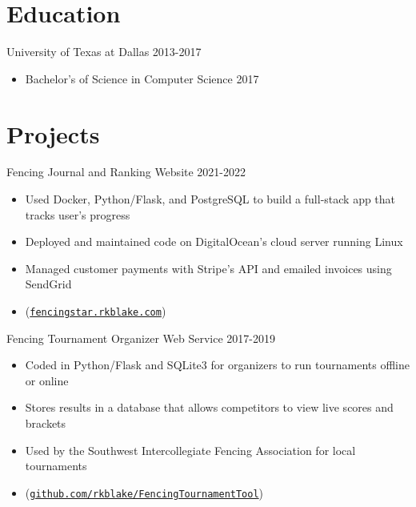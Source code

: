 \documentclass[line,margin]{res}
\begin{document}
\begin{resume}
\begin{itemize}
\end{itemize}

\vspace{-4pt}
\section{Education}
\vspace{12pt}
University of Texas at Dallas \hfill 2013-2017 \\
\vspace{-12pt}
\begin{itemize} \itemsep -2pt
	\item Bachelor's of Science in Computer Science 2017
\end{itemize}

\vspace{-4pt}
\section{Projects}
\vspace{12pt}

Fencing Journal and Ranking Website
\hfill 2021-2022
	\begin{itemize} \itemsep -2pt
		\item Used Docker, Python/Flask, and PostgreSQL to build a full-stack app that tracks user's progress
		\item Deployed and maintained code on DigitalOcean's cloud server running Linux
		\item Managed customer payments with Stripe's API and emailed invoices using SendGrid
		\item (\href{https://fencingstar.rkblake.com}{\texttt{fencingstar.rkblake.com}})
	\end{itemize}

\vspace{-8pt}
Fencing Tournament Organizer Web Service
\hfill 2017-2019
	\begin{itemize} \itemsep -2pt
		\item Coded in Python/Flask and SQLite3 for organizers to run tournaments offline or online
		\item Stores results in a database that allows competitors to view live scores and brackets
		\item Used by the Southwest Intercollegiate Fencing Association for local tournaments
		\item (\href{https://github.com/rkblake/FencingTournamentTool}{\texttt{github.com/rkblake/FencingTournamentTool}})
	\end{itemize}


\end{resume}
\end{document}
